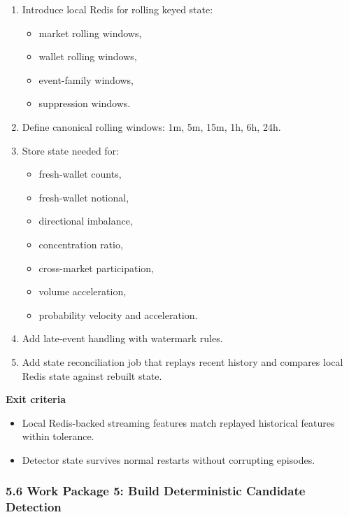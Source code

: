 \documentclass[
]{article}
\providecommand{\tightlist}{%
  \setlength{\itemsep}{0pt}\setlength{\parskip}{0pt}}
\begin{document}
\begin{enumerate}
\def\labelenumi{\arabic{enumi}.}
\tightlist
\item
  Introduce local Redis for rolling keyed state:

  \begin{itemize}
  \tightlist
  \item
    market rolling windows,
  \item
    wallet rolling windows,
  \item
    event-family windows,
  \item
    suppression windows.
  \end{itemize}
\item
  Define canonical rolling windows: 1m, 5m, 15m, 1h, 6h, 24h.
\item
  Store state needed for:

  \begin{itemize}
  \tightlist
  \item
    fresh-wallet counts,
  \item
    fresh-wallet notional,
  \item
    directional imbalance,
  \item
    concentration ratio,
  \item
    cross-market participation,
  \item
    volume acceleration,
  \item
    probability velocity and acceleration.
  \end{itemize}
\item
  Add late-event handling with watermark rules.
\item
  Add state reconciliation job that replays recent history and compares
  local Redis state against rebuilt state.
\end{enumerate}

\textbf{Exit criteria}

\begin{itemize}
\tightlist
\item
  Local Redis-backed streaming features match replayed historical
  features
  within tolerance.
\item
  Detector state survives normal restarts without corrupting episodes.
\end{itemize}

\subsubsection{5.6 Work Package 5: Build Deterministic Candidate
Detection}\label{56-work-package-5-build-deterministic-candidate-detection}
\end{document}
